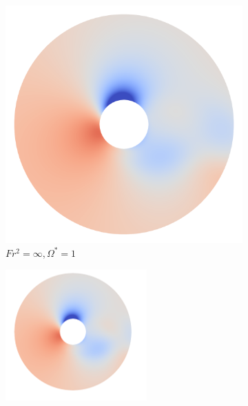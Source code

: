 \begin{figure}
    \begin{subfigure}[b]{0.25\textwidth}
        \centering
        \includegraphics[width=\textwidth]{images/circle/ps1fsinf.png}
        \caption{$Fr^2 = \infty, \Omega^{\ast} = 1$}
        \label{fig:ps1fsinf}
    \end{subfigure}
    \hfill
    \begin{subfigure}[b]{0.25\textwidth}
        \centering
        \includegraphics[width=\textwidth]{images/circle/ps1fs100.png}

\end{subfigure}
\end{figure}
